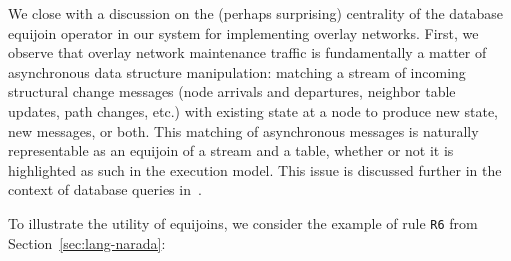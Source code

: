 \documentclass{sig-alt-full}
\newcommand{\ol}[1]{{\tt\footnotesize#1}}
\newcommand{\note}[1]{}
\begin{document}
We close with a discussion on the (perhaps surprising) centrality of the
database equijoin operator in our system for implementing overlay
networks.  First, we observe that overlay network maintenance traffic
is fundamentally a matter of asynchronous data structure manipulation:
matching a stream of incoming structural 
change messages (node arrivals and departures, neighbor table updates,
path changes, etc.) with existing state at a node to produce new
state, new messages, or both. This matching of asynchronous messages is
naturally representable as an equijoin of a stream and a table, whether or
not it is highlighted as such in the execution model.  This issue is
discussed further in the context of database queries
in~\cite{shankar-stems}. 


To illustrate the utility of equijoins, 
% 
we consider the example of rule \ol{R6} from Section~\ref{sec:lang-narada}:
\end{document}
